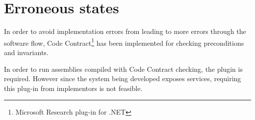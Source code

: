 \documentclass[../report.tex]{subfiles}
\begin{document}
\section{Erroneous states}

In order to avoid implementation errors from leading to more errors through the software flow, Code Contract\footnote{Microsoft Research plug-in for .NET} has been implemented for checking preconditions and invariants.

In order to run assemblies compiled with Code Contract checking, the plugin is required. However since the system being developed exposes services, requiring this plug-in from implementors is not feasible.
\end{document}

